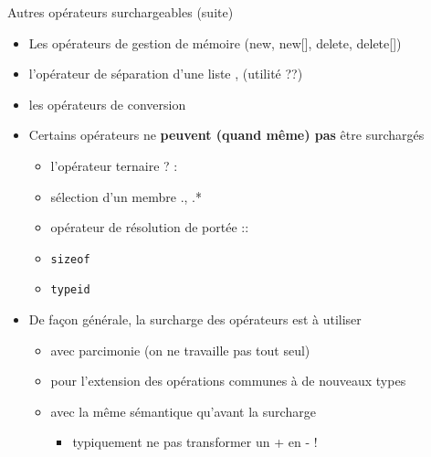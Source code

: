 \begin{frame}{Autres opérateurs surchargeables (suite)}

\begin{itemize}
\itemsep1pt\parskip0pt
\item
  Les opérateurs de gestion de mémoire (new, new{[}{]}, delete,
  delete{[}{]})
\item
  l'opérateur de séparation d'une liste , (utilité ??)
\item
  les opérateurs de conversion
\item
  Certains opérateurs ne \textbf{peuvent (quand même) pas} être
  surchargés

  \begin{itemize}
  \itemsep1pt\parskip0pt
  \item
    l'opérateur ternaire ? :
  \item
    sélection d'un membre ., .*
  \item
    opérateur de résolution de portée ::
  \item
    \texttt{sizeof}
  \item
    \texttt{typeid}
  \end{itemize}
\item
  De façon générale, la surcharge des opérateurs est à utiliser

  \begin{itemize}
  \itemsep1pt\parskip0pt
  \item
    avec parcimonie (on ne travaille pas tout seul)
  \item
    pour l'extension des opérations communes à de nouveaux types
  \item
    avec la même sémantique qu'avant la surcharge

    \begin{itemize}
    \itemsep1pt\parskip0pt
    \item
      typiquement ne pas transformer un + en - !
    \end{itemize}
  \end{itemize}
\end{itemize}

\end{frame}

